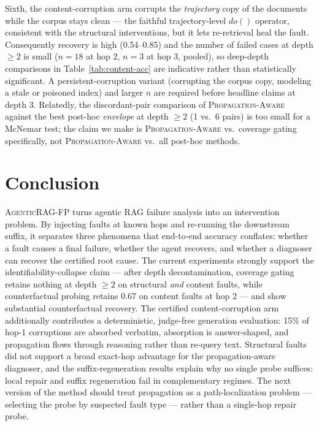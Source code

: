 \documentclass[11pt]{article}
\newcommand{\ours}{\textnormal{\textsc{AgenticRAG-FP}}}
\newcommand{\pa}{\textnormal{\textsc{Propagation-Aware}}}
\begin{document}
Sixth, the content-corruption arm corrupts the \emph{trajectory} copy of the
documents while the corpus stays clean --- the faithful trajectory-level
$do()$ operator, consistent with the structural interventions, but it lets
re-retrieval heal the fault.  Consequently recovery is high (0.54--0.85) and
the number of failed cases at depth $\geq 2$ is small ($n{=}18$ at hop 2,
$n{=}3$ at hop 3, pooled), so deep-depth comparisons in
Table~\ref{tab:content-acc} are indicative rather than statistically
significant.  A persistent-corruption variant (corrupting the corpus copy,
modeling a stale or poisoned index) and larger $n$ are required before
headline claims at depth 3.  Relatedly, the discordant-pair comparison of
\pa{} against the best post-hoc \emph{envelope} at depth $\geq 2$ (1 vs.\ 6
pairs) is too small for a McNemar test; the claim we make is \pa{} vs.\
coverage gating specifically, not \pa{} vs.\ all post-hoc methods.

\section{Conclusion}

\ours{} turns agentic RAG failure analysis into an intervention problem.  By
injecting faults at known hops and re-running the downstream suffix, it separates
three phenomena that end-to-end accuracy conflates: whether a fault causes a
final failure, whether the agent recovers, and whether a diagnoser can recover
the certified root cause.  The current experiments strongly support the
identifiability-collapse claim --- after depth decontamination, coverage gating
retains nothing at depth $\geq 2$ on structural \emph{and} content faults,
while counterfactual probing retains 0.67 on content faults at hop 2 --- and
show substantial counterfactual recovery.  The certified content-corruption
arm additionally contributes a deterministic, judge-free generation evaluation:
15\% of hop-1 corruptions are absorbed verbatim, absorption is answer-shaped,
and propagation flows through reasoning rather than re-query text.  Structural
faults did not support a broad exact-hop advantage for the propagation-aware
diagnoser, and the suffix-regeneration results explain why no single probe
suffices: local repair and suffix regeneration fail in complementary regimes.
The next version of the method should treat propagation as a path-localization
problem --- selecting the probe by suspected fault type --- rather than a
single-hop repair probe.



\end{document}
